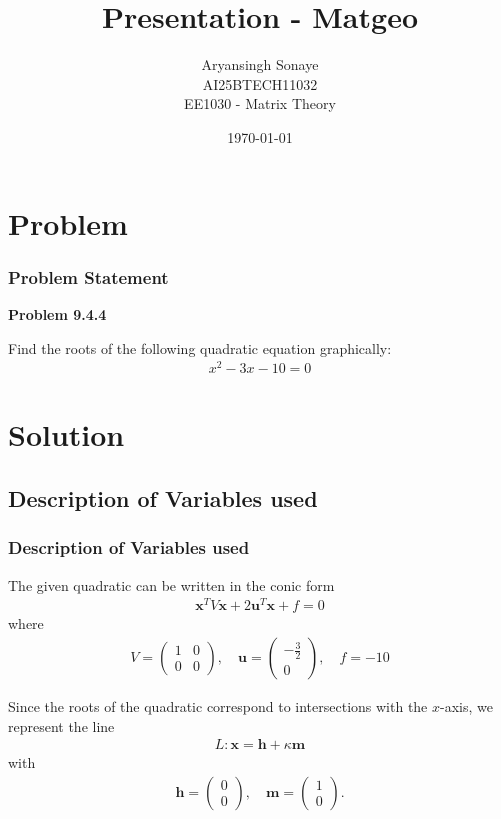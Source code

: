 \documentclass{beamer}
\title{Presentation - Matgeo}
\author{Aryansingh Sonaye \\
AI25BTECH11032 \\
EE1030 - Matrix Theory}
\date{\today}
\theoremstyle{remark}
\newcommand{\myvec}[1]{\ensuremath{\begin{pmatrix}#1\end{pmatrix}}}
\let\vec\mathbf
\numberwithin{equation}{section}
\begin{document}
\begin{frame}
\titlepage
\end{frame}

\section{Problem}
\begin{frame}
\frametitle{Problem Statement}
\textbf{Problem 9.4.4}

Find the roots of the following quadratic equation graphically:
\begin{align}
x^2 - 3x - 10 = 0
\end{align}


\end{frame}

\section{Solution}
\subsection{Description of Variables used}
\begin{frame}
\frametitle{Description of Variables used}
The given quadratic can be written in the conic form
\begin{align}
\vec{x}^T V \vec{x} + 2\vec{u}^T \vec{x} + f = 0
\end{align}
where
\begin{align}
V = \myvec{1 & 0 \\ 0 & 0}, \quad
\vec{u} = \myvec{-\tfrac{3}{2} \\ 0}, \quad
f = -10
\end{align}

Since the roots of the quadratic correspond to intersections with the $x$-axis, we represent the line
\begin{align}
L: \vec{x} = \vec{h} + \kappa \vec{m}
\end{align}
with
\begin{align}
\vec{h} = \myvec{0 \\ 0}, \quad
\vec{m} = \myvec{1 \\ 0}.
\end{align}

\end{frame}
\end{document}
